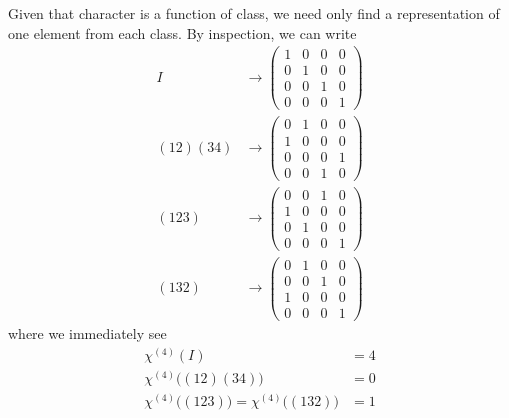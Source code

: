 \documentclass[../group-theory-in-a-nutshell-for-physicists.tex]{subfiles}
\begin{document}
\begin{questions}
\begin{solution}
	Given that character is a function of class, we need only find a representation of one element from each class. By inspection, we can write
	\begin{align*}
		I &\to \begin{pmatrix}1 & 0 & 0 & 0 \\ 0 & 1 & 0 & 0 \\ 0 & 0 & 1 & 0 \\ 0 & 0 & 0 & 1\end{pmatrix} \\
		(12)(34) &\to \begin{pmatrix}0 & 1 & 0 & 0 \\ 1 & 0 & 0 & 0 \\ 0 & 0 & 0 & 1 \\ 0 & 0 & 1 & 0\end{pmatrix} \\
		(123) &\to \begin{pmatrix}0 & 0 & 1 & 0 \\ 1 & 0 & 0 & 0 \\ 0 & 1 & 0 & 0 \\ 0 & 0 & 0 & 1\end{pmatrix} \\
		(132) &\to \begin{pmatrix}0 & 1 & 0 & 0 \\ 0 & 0 & 1 & 0 \\ 1 & 0 & 0 & 0 \\ 0 & 0 & 0 & 1\end{pmatrix}
	\end{align*}
	where we immediately see
	\begin{align*}
		\chi^{(4)}(I) &= 4 \\
		\chi^{(4)}\big((12)(34)\big) &= 0 \\
		\chi^{(4)}\big((123)\big) = \chi^{(4)}\big((132)\big) &= 1
	\end{align*}
\end{solution}

\end{questions}
\end{document}
